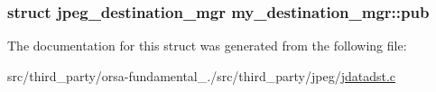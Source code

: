 \subsubsection[{pub}]{\setlength{\rightskip}{0pt plus 5cm}struct {\bf jpeg\+\_\+destination\+\_\+mgr} my\+\_\+destination\+\_\+mgr\+::pub}\label{structmy__destination__mgr_a79800f27d02bb0446203ecf552034980}


The documentation for this struct was generated from the following file\+:\begin{DoxyCompactItemize}
\item 
src/third\+\_\+party/orsa-\/fundamental\+\_./src/third\+\_\+party/jpeg/\hyperlink{jdatadst_8c}{jdatadst.\+c}\end{DoxyCompactItemize}
